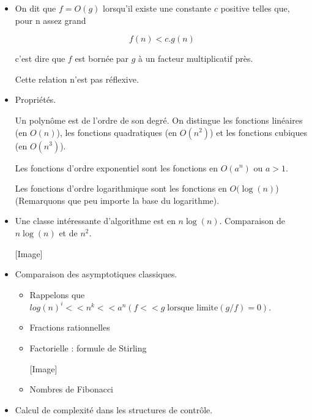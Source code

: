 \begin{multicols}{2}
{\begin{itemize}
\begin{itemize}
          Remarquons que cette relation est r\'eflexive.

        \item  On dit que $f=O(g)$ lorsqu'il existe une constante $c$ positive
			   telles que, pour n assez grand

            \[ f(n) < c.g(n)  \]

          c'est dire que $f$ est born\'ee par $g$ \`a un facteur
          multiplicatif pr\`es.

          Cette relation n'est pas r\'eflexive.

        \item  Propri\'et\'es.

          Un polyn\^ome est de l'ordre de son degr\'e. On distingue les
          fonctions lin\'eaires (en $O(n)$), les fonctions quadratiques (en
          $O(n^{2})$) et les fonctions cubiques (en $O(n^{3})$).

          Les fonctions d'ordre exponentiel sont les fonctions en $O(a^{n})$
		  ou $a >1$.

          Les fonctions d'ordre logarithmique sont les fonctions en
          $O(\log(n)$) (Remarquons que peu importe la base du logarithme).

        \item  Une classe int\'eressante d'algorithme est en $n \log(n)$.
		Comparaison de $n\log(n)$ et de $n^{2}$.

                                        [Image]
        \item  Comparaison des asymptotiques classiques.

             \begin{itemize} 
             \item  Rappelons que $log(n)^{i} << n^{k} << a^{n} (f<<g \; 
			 \mbox{lorsque limite}(g/f) = 0)$.
             \item  Fractions rationnelles
             \item  Factorielle : formule de Stirling

                                          [Image]

             \item  Nombres de Fibonacci
			 \end{itemize} 

   \item  Calcul de complexit\'e dans les structures de contr\^ole.


\end{itemize}
\end{itemize}}
\end{multicols}
